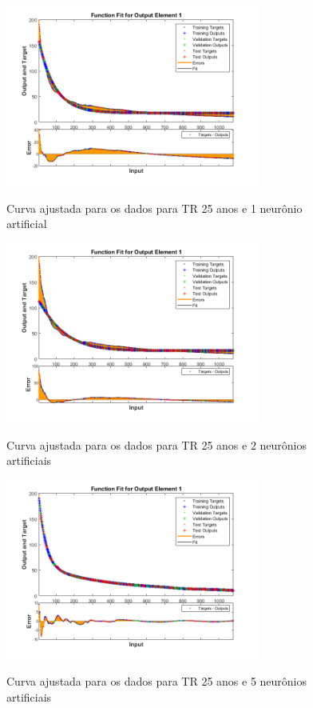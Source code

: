 \begin{figure}[H]
    \caption{Curva ajustada para os dados para TR 25 anos e 1 neurônio artificial}
    \centering
    \includegraphics[width=0.74\textwidth]{Textuais/Figuras/NN/tr25-1neuronio.png}
    \label{fig:tr25-1n}
\end{figure}

\begin{figure}[H]
    \caption{Curva ajustada para os dados para TR 25 anos e 2 neurônios artificiais}
    \centering
    \includegraphics[width=0.74\textwidth]{Textuais/Figuras/NN/tr25-2neuronio.png}
    \label{fig:tr25-2n}
\end{figure}

\begin{figure}[H]
    \caption{Curva ajustada para os dados para TR 25 anos e 5 neurônios artificiais}
    \centering
    \includegraphics[width=0.74\textwidth]{Textuais/Figuras/NN/tr25-5neuronio.png}
    \label{fig:tr25-5n}
\end{figure}


